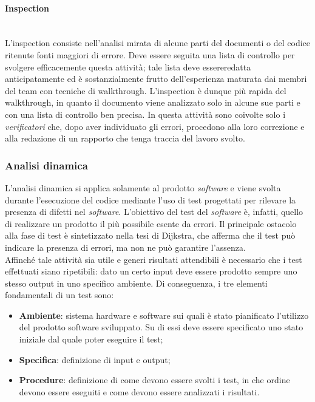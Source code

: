 \paragraph{Inspection} \mbox{} \\
L'inspection consiste nell'analisi mirata di alcune parti del documenti o del codice ritenute fonti maggiori di errore. Deve essere seguita una lista di controllo per svolgere efficacemente questa attività; tale lista deve essereredatta anticipatamente ed è sostanzialmente frutto dell'esperienza maturata dai membri del team con tecniche di walkthrough. L'inspection è dunque più rapida del walkthrough, in quanto il documento viene analizzato solo in alcune sue parti e con una lista di controllo ben precisa. In questa attività sono coivolte solo i \textit{verificatori} che, dopo aver individuato gli errori, procedono alla loro correzione e alla redazione di un rapporto che tenga traccia del lavoro svolto.

\subsubsection{Analisi dinamica}
L'analisi dinamica si applica solamente al prodotto \textit{software} e viene svolta durante l'esecuzione del codice mediante l'uso di test progettati per rilevare la presenza di difetti nel \textit{software}. L'obiettivo del test del \textit{software} è, infatti, quello di realizzare un prodotto il più possibile esente da errori. Il principale ostacolo alla fase di test è sintetizzato nella tesi di Dijkstra, che afferma che il test può indicare la presenza di errori, ma non ne può garantire l'assenza. \\
Affinché tale attività sia utile e generi risultati attendibili è necessario che i test effettuati siano ripetibili: dato un certo input deve essere prodotto sempre uno stesso output in uno specifico ambiente. Di conseguenza, i tre elementi fondamentali di un test sono:
\begin{itemize}
\item \textbf{Ambiente}: sistema hardware e software sui quali è stato pianificato l'utilizzo del prodotto software sviluppato. Su di essi deve essere specificato uno stato iniziale dal quale poter eseguire il test;
\item \textbf{Specifica}: definizione di input e output;
\item \textbf{Procedure}: definizione di come devono essere svolti i test, in che ordine devono essere eseguiti e come devono essere analizzati i risultati.
\end{itemize}

